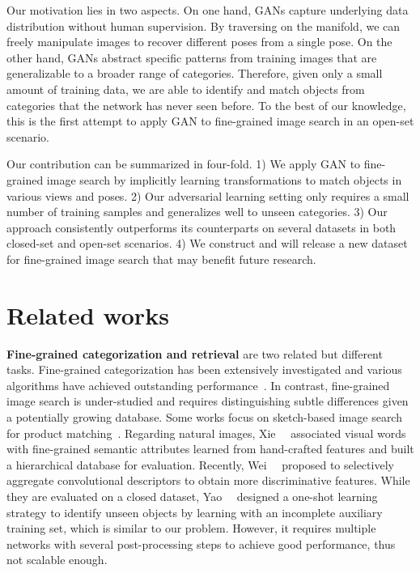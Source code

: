 \documentclass[runningheads]{llncs}
\begin{document}
Our motivation lies in two aspects. On one hand, GANs capture underlying data distribution without human supervision.
By traversing on the manifold, we can freely manipulate images to recover different poses from a single pose.
On the other hand, GANs abstract specific patterns from training images that are generalizable to a broader range of categories. 
Therefore, given only a small amount of training data, we are able to identify and match objects from categories that the network has never seen before. 
To the best of our knowledge, this is the first attempt to apply GAN to fine-grained image search in an open-set scenario.


Our contribution can be summarized in four-fold. 1) We apply GAN to fine-grained image search by implicitly learning transformations to match objects in various views and poses. 
2) Our adversarial learning setting only requires a small number of training samples and generalizes well to unseen categories. 
3) Our approach consistently outperforms its counterparts on several datasets in both closed-set and open-set scenarios. 
4) We construct and will release a new dataset for fine-grained image search that may benefit future research. 
\section{Related works}\label{sec:related-works}{\flushleft \textbf{Fine-grained categorization and retrieval}} are two related but different tasks. 
Fine-grained categorization has been extensively investigated and various algorithms have achieved outstanding performance~\cite{DBLP:conf/cvpr/DengK013,DBLP:conf/icpr/KrauseGDLF14,DBLP:conf/cvpr/KrauseJYL15,DBLP:conf/cvpr/QianJZL15,DBLP:conf/cvpr/XieYWL15,lin2015bilinear,DBLP:conf/cvpr/CuiZLB16,zhou2016fine,cui2017kernel}.
In contrast, fine-grained image search is under-studied and requires distinguishing subtle differences given a potentially growing database. 
Some works focus on sketch-based image search for product matching~\cite{DBLP:conf/sigir/HuangCJZZ17,Song_2017_ICCV}. 
Regarding natural images, Xie~\etal~\cite{DBLP:journals/tmm/XieWZT15} associated visual words with fine-grained semantic attributes learned from hand-crafted features and built a hierarchical database for evaluation. 
Recently, Wei~\etal~\cite{DBLP:journals/tip/WeiLWZ17} proposed to selectively aggregate convolutional descriptors to obtain more discriminative features. 
While they are evaluated on a closed dataset, Yao~\etal~\cite{DBLP:journals/corr/YaoZZLT17a} designed a one-shot learning strategy to identify unseen objects by learning with an incomplete auxiliary training set, which is similar to our problem. However, it requires multiple networks with several post-processing steps to achieve good performance, thus not scalable enough.
\end{document}
